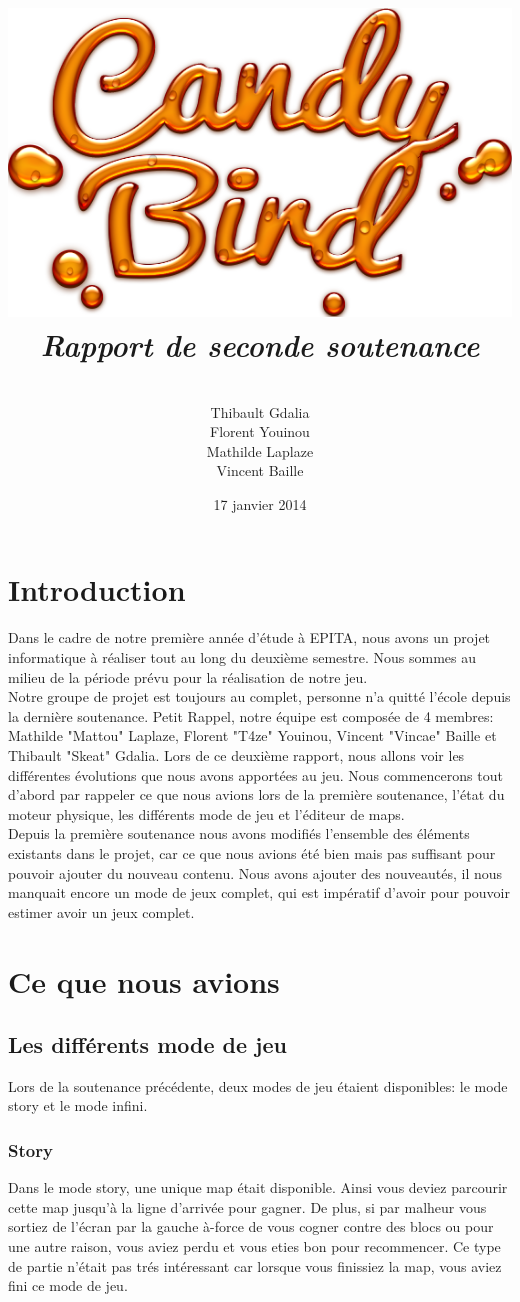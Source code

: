 \documentclass [11pt]{report}
\title{
	\includegraphics[scale=0.43]{images/Logojeu.png}
	 \\\vspace{20mm}
	\textbf{\Huge \itshape Rapport de seconde soutenance  }
	}
\author{ \\\vspace{2mm}
	Thibault Gdalia\\\vspace{2mm}
	Florent Youinou\\\vspace{2mm}
	Mathilde Laplaze\\\vspace{2mm}
	Vincent Baille \\\vspace{30mm}
	}
\date{17 janvier 2014}
\begin{document}
\thispagestyle{fancy}
\renewcommand{\baselinestretch}{0.001}
\maketitle
\tableofcontents

\chapter*{Introduction} 
Dans le cadre de notre premi\`ere année d'étude \`a EPITA, nous avons un projet informatique \`a réaliser tout au long du deuxi\`eme semestre. Nous sommes au milieu de la période prévu pour la réalisation de notre jeu. \\

Notre groupe de projet est toujours au complet, personne n'a quitté l'école depuis la derni\`ere soutenance. Petit Rappel, notre équipe est composée de 4 membres: Mathilde "Mattou" Laplaze, Florent "T4ze" Youinou, Vincent "Vincae" Baille et Thibault "Skeat" Gdalia. Lors de ce deuxi\`eme rapport, nous allons voir les différentes évolutions que nous avons apportées au jeu. Nous commencerons tout d'abord par rappeler ce que nous avions lors de la premi\`ere soutenance, l'état du moteur physique, les différents mode de jeu et l'éditeur de maps. \\

Depuis la premi\`ere soutenance nous avons modifiés l'ensemble des \'el\'ements existants dans le projet, car ce que nous avions \'et\'e bien mais pas suffisant pour pouvoir ajouter du nouveau contenu. Nous avons ajouter des nouveaut\'es, il nous manquait encore un mode de jeux complet, qui est imp\'eratif d'avoir pour pouvoir estimer avoir un jeux complet.\\





\chapter{Ce que nous avions}
	\section{Les différents mode de jeu}
		Lors de la soutenance précédente, deux modes de jeu étaient disponibles: le mode story et le mode infini.
		
		\vspace{10mm}
		
		\subsection{Story}
			Dans le mode story, une unique map était disponible. Ainsi vous deviez parcourir cette map jusqu'à la ligne d'arrivée pour gagner. De plus, si par malheur vous sortiez de l'écran par la gauche \`a-force de vous cogner contre des blocs ou pour une autre raison, vous aviez perdu et vous eties bon pour recommencer. Ce type de partie n'était pas trés intéressant car lorsque vous finissiez la map, vous aviez fini ce mode de jeu. \\
			
\end{document}
